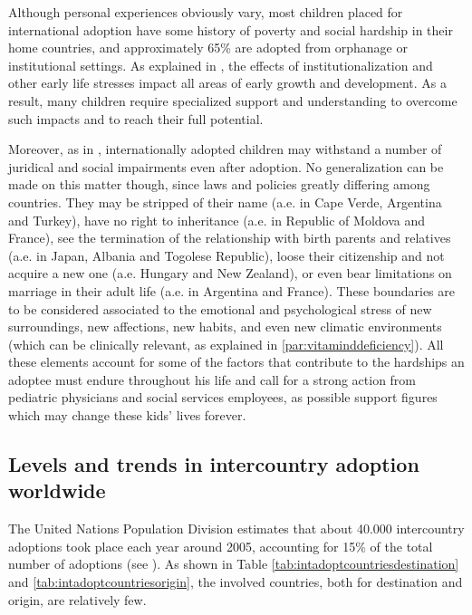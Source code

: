 Although personal experiences obviously vary, most children placed for international adoption have some history of poverty and social hardship in their home countries, and approximately 65\% are adopted from orphanage or institutional settings. As explained in \cite{nelson}, the effects of institutionalization and other early life stresses impact all areas of early growth and development. As a result, many children require specialized support and understanding to overcome such impacts and to reach their full potential. 

Moreover, as in \cite{unreport}, internationally adopted children may withstand a number of juridical and social impairments even after adoption. No generalization can be made on this matter though, since laws and policies greatly differing among countries. They may be stripped of their name (a.e. in Cape Verde, Argentina and Turkey), have no right to inheritance (a.e. in Republic of Moldova and France), see the termination of the relationship with birth parents and relatives (a.e. in Japan, Albania and Togolese Republic), loose their citizenship and not acquire a new one (a.e. Hungary and New Zealand), or even bear limitations on marriage in their adult life (a.e. in Argentina and France). These boundaries are to be considered associated to the emotional and psychological stress of new surroundings, new affections, new habits, and even new climatic environments (which can be clinically relevant, as explained in \ref{par:vitaminddeficiency}). \linebreak All these elements account for some of the factors that contribute to the hardships an adoptee must endure throughout his life and call for a strong action from pediatric physicians and social services employees, as possible support figures which may change these kids' lives forever.


\subsection{Levels and trends in intercountry adoption worldwide}\label{sub:levelsintercountry}
The United Nations Population Division estimates that about 40.000 intercountry adoptions took place each year around 2005, accounting for 15\% of the total number of adoptions (see \cite{unreport}). As shown in Table \ref{tab:intadoptcountriesdestination} and \ref{tab:intadoptcountriesorigin}, the involved countries, both for destination and origin, are relatively few. 

